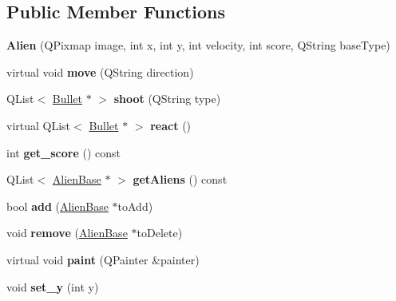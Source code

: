 \subsection*{Public Member Functions}
\begin{DoxyCompactItemize}
\item 
\mbox{\label{classgame_1_1Alien_ae5772cdffcca2587c44d47adc6d74724}} 
{\bfseries Alien} (Q\+Pixmap image, int x, int y, int velocity, int score, Q\+String base\+Type)
\item 
\mbox{\label{classgame_1_1Alien_ac37a3b5d6505bbc63ac74cdf6584cff8}} 
virtual void {\bfseries move} (Q\+String direction)
\item 
\mbox{\label{classgame_1_1Alien_af67d4dec3819a91db7548be3861981c7}} 
Q\+List$<$ \hyperlink{classgame_1_1Bullet}{Bullet} $\ast$ $>$ {\bfseries shoot} (Q\+String type)
\item 
\mbox{\label{classgame_1_1Alien_a9d540a0c44c487f15973149bdbc6097f}} 
virtual Q\+List$<$ \hyperlink{classgame_1_1Bullet}{Bullet} $\ast$ $>$ {\bfseries react} ()
\item 
\mbox{\label{classgame_1_1Alien_af52085eda6608a464e997ff4f7b441da}} 
int {\bfseries get\+\_\+score} () const
\item 
\mbox{\label{classgame_1_1Alien_a61256979be794e89e2699bcd54699116}} 
Q\+List$<$ \hyperlink{classgame_1_1AlienBase}{Alien\+Base} $\ast$ $>$ {\bfseries get\+Aliens} () const
\item 
\mbox{\label{classgame_1_1Alien_a9703a5949b6152a0d8eca6c5fbc2d2dd}} 
bool {\bfseries add} (\hyperlink{classgame_1_1AlienBase}{Alien\+Base} $\ast$to\+Add)
\item 
\mbox{\label{classgame_1_1Alien_a796c1bf799a1b48b28f8ac78a1926383}} 
void {\bfseries remove} (\hyperlink{classgame_1_1AlienBase}{Alien\+Base} $\ast$to\+Delete)
\item 
\mbox{\label{classgame_1_1Alien_a8bf077a07e4849840f58f861a006f948}} 
virtual void {\bfseries paint} (Q\+Painter \&painter)
\item 
\mbox{\label{classgame_1_1Alien_aa928f035f45b762ab4eeb819a7413450}} 
void {\bfseries set\+\_\+y} (int y)
\end{DoxyCompactItemize}
